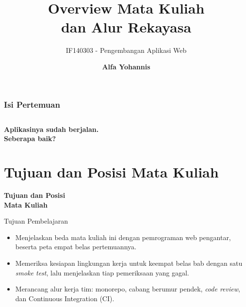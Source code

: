 \documentclass[aspectratio=169, table, 12pt]{beamer}
\title{\Huge Overview Mata Kuliah\\ \vspace{10pt} dan Alur Rekayasa}
\subtitle{IF140303 - Pengembangan Aplikasi Web}
\author{\textbf{Alfa Yohannis}}
\begin{document}
\frame{\titlepage}

\begin{frame}[fragile]
  \frametitle{Isi Pertemuan}
  \vspace{14pt}
  \begin{columns}[t]
    {\small\tableofcontents[sections={1-6}]}

    {\small\tableofcontents[sections={7-12}]}
  \end{columns}
\end{frame}

\begin{frame}{\hfill}
  \centering
  \Huge{\textbf{Aplikasinya sudah berjalan.\\Seberapa baik?}}
\end{frame}

\section{Tujuan dan Posisi Mata Kuliah}

\begin{frame}{\hfill}
  \centering
  \Huge{\textbf{Tujuan dan Posisi\\Mata Kuliah}}
\end{frame}

\begin{frame}{{\Large Tujuan Pembelajaran}}
  \vspace{10pt}
  \begin{itemize}
    \item Menjelaskan beda mata kuliah ini dengan pemrograman web pengantar,
          beserta peta empat belas pertemuannya.
    \item Memeriksa kesiapan lingkungan kerja untuk keempat belas bab dengan
          satu \textit{smoke test}, lalu menjelaskan tiap pemeriksaan yang
          gagal.
    \item Merancang alur kerja tim: monorepo, cabang berumur pendek,
          \textit{code review}, dan Continuous Integration (CI).
  \end{itemize}
\end{frame}
\end{document}
